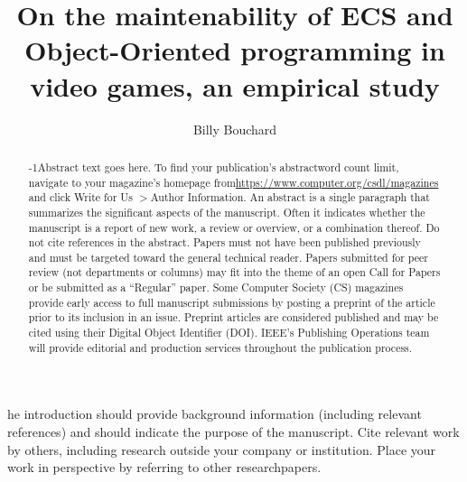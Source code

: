 \documentclass{IEEEcsmag}
\begin{document}

\title{On the maintenability of ECS and Object-Oriented programming in video games, an empirical study}

\author{ Billy Bouchard}


\begin{abstract}\looseness-1Abstract text goes here. To find your publication's abstract\break word count limit, navigate to your magazine's homepage from\break \href{https://www.computer.org/csdl/magazines}{https://www.computer.org/csdl/magazines} and click Write for Us $>$Author Information. An abstract is a single paragraph that summarizes the significant aspects of the manuscript. Often it indicates whether the manuscript is a report of new work, a review or overview, or a combination thereof. Do not cite references in the abstract. Papers must not have been published previously and must be targeted toward the general technical reader. Papers submitted for peer review (not departments or columns) may fit into the theme of an open Call for Papers or be submitted as a ``Regular'' paper. Some Computer Society (CS) magazines provide early access to full manuscript submissions by posting a preprint of the article prior to its inclusion in an issue. Preprint articles are considered published and may be cited using their Digital Object Identifier (DOI). IEEE's Publishing Operations team will provide editorial and production services throughout the publication process.
\end{abstract}

\maketitle


he introduction should provide background information (including relevant references) and should indicate the purpose of the manuscript. Cite relevant work by others, including research outside your company or institution. Place your work in perspective by referring to other research\break papers.


\end{document}
